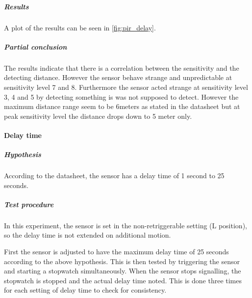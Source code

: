 \subparagraph{Results}

A plot of the results can be seen in \cref{fig:pir_delay}.

\begin{figure}[htbp]
\centering
{}
\end{figure}

\subparagraph{Partial conclusion}
The results indicate that there is a correlation between the sensitivity and the detecting distance.
However the sensor behave strange and unpredictable at sensitivity level 7 and 8.
Furthermore the sensor acted strange at sensitivity level 3, 4 and 5 by detecting something is was not supposed to detect.
However the maximum distance range seem to be 6meters as stated in the datasheet but at peak sensitivity level
the distance drops down to 5 meter only.

\paragraph{Delay time}

\subparagraph{Hypothesis}

According to the datasheet, the sensor has a delay time of 1 second to 25 seconds.

\subparagraph{Test procedure}

In this experiment, the sensor is set in the non-retriggerable setting (L
position), so the delay time is not extended on additional motion.

First the sensor is adjusted to have the maximum delay time of 25 seconds
according to the above hypothesis. This is then tested by triggering the sensor
and starting a stopwatch simultaneously. When the sensor stops signalling, the
stopwatch is stopped and the actual delay time noted. This is done three times
for each setting of delay time to check for consistency.


